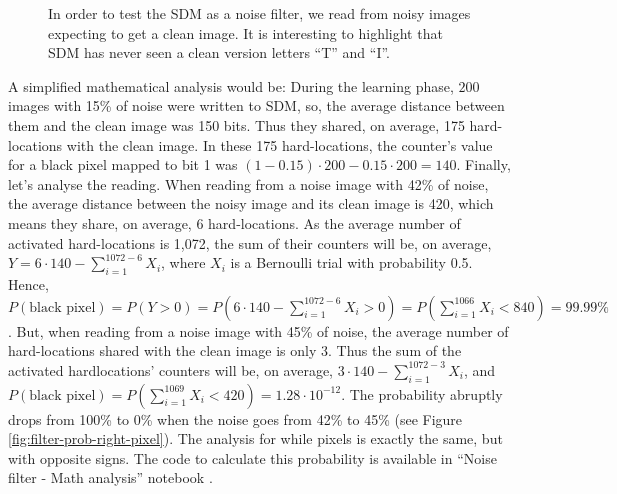 \begin{figure}[!htb]


  \caption{In order to test the SDM as a noise filter, we read from noisy images expecting to get a clean image. It is interesting to highlight that SDM has never seen a clean version letters ``T'' and ``I''.
  \label{fig:filter-testing}
  }
\end{figure}

A simplified mathematical analysis would be: During the learning phase, $200$ images with 15\% of noise were written to SDM, so, the average distance between them and the clean image was 150 bits. Thus they shared, on average, 175 hard-locations with the clean image. In these 175 hard-locations, the counter's value for a black pixel mapped to bit 1 was $(1-0.15) \cdot 200 - 0.15 \cdot 200 = 140$. Finally, let's analyse the reading. When reading from a noise image with 42\% of noise, the average distance between the noisy image and its clean image is 420, which means they share, on average, 6 hard-locations. As the average number of activated hard-locations is 1,072, the sum of their counters will be, on average, $Y = 6 \cdot 140 - \sum_{i=1}^{1072-6} X_i$, where $X_i$ is a Bernoulli trial with probability 0.5. Hence, $P(\text{black pixel}) = P(Y > 0) = P(6 \cdot 140 - \sum_{i=1}^{1072-6} X_i > 0) = P(\sum_{i=1}^{1066} X_i < 840) = 99.99\%$. But, when reading from a noise image with 45\% of noise, the average number of hard-locations shared with the clean image is only 3. Thus the sum of the activated hardlocations' counters will be, on average, $3 \cdot 140 - \sum_{i=1}^{1072-3} X_i$, and $P(\text{black pixel}) = P(\sum_{i=1}^{1069} X_i < 420) = 1.28 \cdot 10^{-12}$. The probability abruptly drops from 100\% to 0\% when the noise goes from 42\% to 45\% (see Figure \ref{fig:filter-prob-right-pixel}). The analysis for while pixels is exactly the same, but with opposite signs. The code to calculate this probability is available in ``Noise filter - Math analysis'' notebook \citep{sdmframework}.

